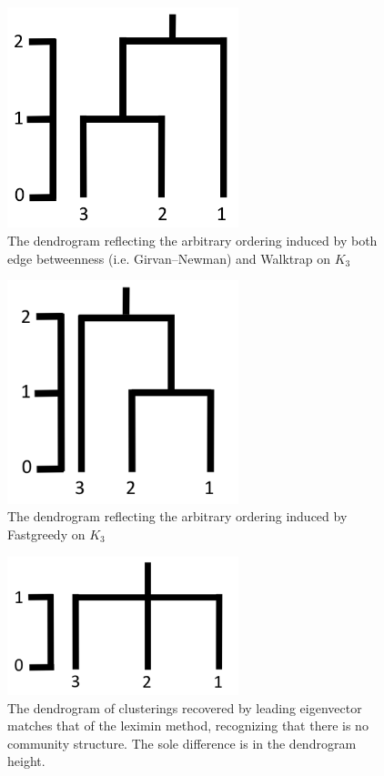 \begin{figure}
\centering
\includegraphics[width=0.6\textwidth]{fig/dendrogram_3_no_tie_2}
\caption{The dendrogram reflecting the arbitrary ordering induced by both edge betweenness (i.e. Girvan--Newman) and Walktrap on $K_3$}
\label{fig:dendrogram_3_no_tie_2}
\end{figure}

\begin{figure}
\centering
\includegraphics[width=0.6\textwidth]{fig/dendrogram_3_no_tie}
\caption{The dendrogram reflecting the arbitrary ordering induced by Fastgreedy on $K_3$}
\label{fig:dendrogram_3_no_tie}
\end{figure}

\begin{figure}
\centering
\includegraphics[width=0.6\textwidth]{fig/dendrogram_3_tie}
\caption{The dendrogram of clusterings recovered by leading eigenvector matches that of the leximin method, recognizing that there is no community structure. The sole difference is in the dendrogram height.}
\label{fig:dendrogram_3_tie}
\end{figure}



